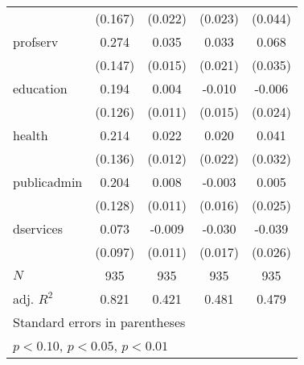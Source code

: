 {\begin{tabular}{l*{4}{c}}
            &     (0.167)         &     (0.022)         &     (0.023)         &     (0.044)         \\
[1em]
profserv    &       0.274\sym{*}  &       0.035\sym{**} &       0.033         &       0.068\sym{*}  \\
            &     (0.147)         &     (0.015)         &     (0.021)         &     (0.035)         \\
[1em]
education   &       0.194         &       0.004         &      -0.010         &      -0.006         \\
            &     (0.126)         &     (0.011)         &     (0.015)         &     (0.024)         \\
[1em]
health      &       0.214         &       0.022\sym{*}  &       0.020         &       0.041         \\
            &     (0.136)         &     (0.012)         &     (0.022)         &     (0.032)         \\
[1em]
publicadmin &       0.204         &       0.008         &      -0.003         &       0.005         \\
            &     (0.128)         &     (0.011)         &     (0.016)         &     (0.025)         \\
[1em]
dservices   &       0.073         &      -0.009         &      -0.030\sym{*}  &      -0.039         \\
            &     (0.097)         &     (0.011)         &     (0.017)         &     (0.026)         \\
\hline
\(N\)       &         935         &         935         &         935         &         935         \\
adj. \(R^{2}\)&       0.821         &       0.421         &       0.481         &       0.479         \\
\hline\hline
\multicolumn{5}{l}{\footnotesize Standard errors in parentheses}\\
\multicolumn{5}{l}{\footnotesize \sym{*} \(p<0.10\), \sym{**} \(p<0.05\), \sym{***} \(p<0.01\)}\\
\end{tabular}
}
